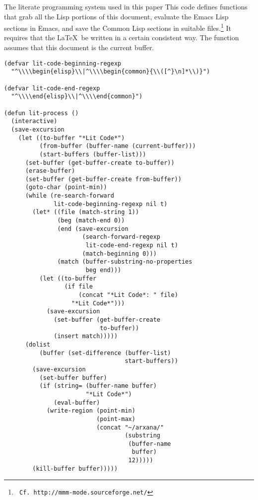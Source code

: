 \begin{notate}{The literate programming system used in this paper}
This code defines functions that grab all the Lisp
portions of this document, evaluate the Emacs Lisp
sections in Emacs, and save the Common Lisp sections in
suitable files.\footnote{{\tt
    Cf. http://mmm-mode.sourceforge.net/}} It requires
that the \LaTeX\ be written in a certain consistent way.
The function assumes that this document is the current
buffer.

\begin{verbatim}
(defvar lit-code-beginning-regexp
  "^\\\\begin{elisp}\\|^\\\\begin{common}{\\([^}\n]*\\)}")

(defvar lit-code-end-regexp
  "^\\\\end{elisp}\\|^\\\\end{common}")

(defun lit-process ()
  (interactive)
  (save-excursion
    (let ((to-buffer "*Lit Code*")
          (from-buffer (buffer-name (current-buffer)))
          (start-buffers (buffer-list)))
      (set-buffer (get-buffer-create to-buffer))
      (erase-buffer)
      (set-buffer (get-buffer-create from-buffer))
      (goto-char (point-min))
      (while (re-search-forward
              lit-code-beginning-regexp nil t)
        (let* ((file (match-string 1))
               (beg (match-end 0))
               (end (save-excursion
                      (search-forward-regexp
                       lit-code-end-regexp nil t)
                      (match-beginning 0)))
               (match (buffer-substring-no-properties
                       beg end)))
          (let ((to-buffer
                 (if file
                     (concat "*Lit Code*: " file)
                   "*Lit Code*")))
            (save-excursion
              (set-buffer (get-buffer-create
                           to-buffer))
              (insert match)))))
      (dolist
          (buffer (set-difference (buffer-list)
                                  start-buffers))
        (save-excursion
          (set-buffer buffer)
          (if (string= (buffer-name buffer)
                       "*Lit Code*")
              (eval-buffer)
            (write-region (point-min)
                          (point-max)
                          (concat "~/arxana/"
                                  (substring
                                   (buffer-name
                                    buffer)
                                   12)))))
        (kill-buffer buffer)))))
\end{verbatim}
\end{notate}

